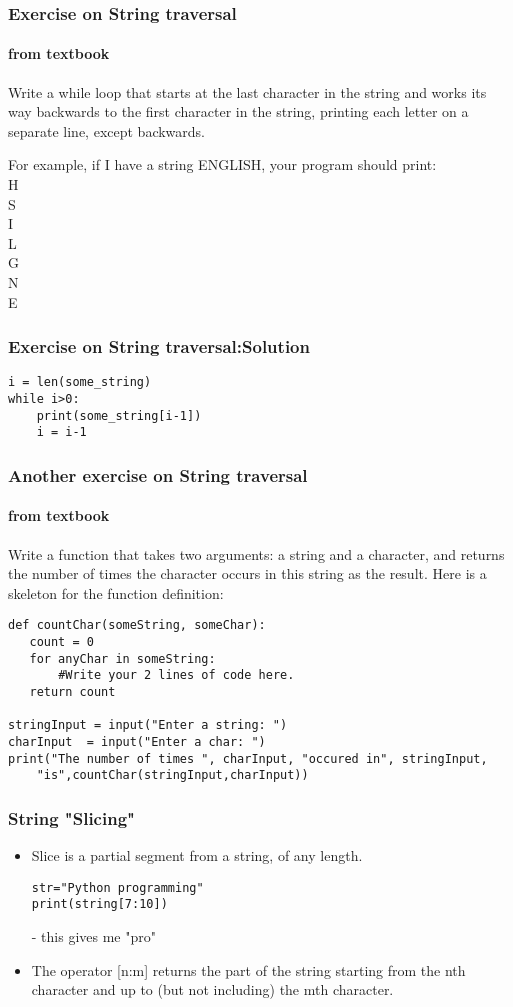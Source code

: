 \documentclass{beamer}
\begin{document}
\begin{frame}
\frametitle{Exercise on String traversal}
\framesubtitle{from textbook}
Write a while loop that starts at the last character in the string and works its way backwards to the first character in the string, printing each letter on a separate line, except backwards. 
 
\medskip
For example, if I have a string ENGLISH, your program should print: \\
H \\
S \\
I \\
L \\
G \\
N \\
E 
\end{frame}

\begin{frame}[fragile]
\frametitle{Exercise on String traversal:Solution}
\begin{verbatim}
i = len(some_string)
while i>0:
    print(some_string[i-1])
    i = i-1
\end{verbatim}
\end{frame}

\begin{frame}[fragile]
\frametitle{Another exercise on String traversal}
\framesubtitle{from textbook}
Write a function that takes two arguments: a string and a character, and returns the number of times the character occurs in this string as the result. Here is a skeleton for the function definition:
\footnotesize
\begin{verbatim}
def countChar(someString, someChar):
   count = 0
   for anyChar in someString:
       #Write your 2 lines of code here.
   return count

stringInput = input("Enter a string: ")
charInput  = input("Enter a char: ")
print("The number of times ", charInput, "occured in", stringInput,
    "is",countChar(stringInput,charInput))
\end{verbatim}
\end{frame}

\begin{frame}[fragile]
\frametitle{String "Slicing"}
\begin{itemize}
\item Slice is a partial segment from a string, of any length. 
\begin{verbatim}
str="Python programming"
print(string[7:10])
\end{verbatim}
- this gives me "pro"
\item The operator [n:m] returns the part of the string starting from the nth character and up to (but not including) the mth character. 
\end{itemize}
\end{frame}
\end{document}
